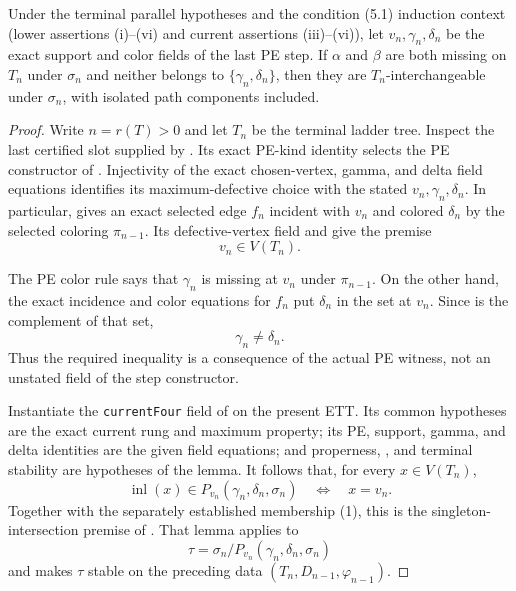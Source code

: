 \begin{helper}
Under the terminal parallel hypotheses and the condition (5.1) induction
context (lower assertions (i)--(vi) and current assertions (iii)--(vi)), let
$v_n,\gamma_n,\delta_n$ be the exact support and color fields of
the last PE step.  If $\alpha$ and $\beta$ are both missing on $T_n$ under
$\sigma_n$ and neither belongs to $\{\gamma_n,\delta_n\}$, then they are
$T_n$-interchangeable under $\sigma_n$, with isolated path components
included.
\end{helper}
\begin{proof}
Write $n=r(T)>0$ and let $T_n$ be the terminal ladder tree.  Inspect the
last certified slot supplied by .  Its exact
PE-kind identity selects the PE constructor of
.  Injectivity of the exact chosen-vertex,
gamma, and delta field equations identifies its maximum-defective choice
with the stated $v_n,\gamma_n,\delta_n$.  In particular,
 gives an exact selected edge $f_n$
incident with $v_n$ and colored $\delta_n$ by the selected coloring
$\pi_{n-1}$.  Its defective-vertex field and
 give the premise
\[
                         v_n\in V(T_n).                         \tag{1}
\]

The PE color rule  says that
$\gamma_n$ is missing at $v_n$ under $\pi_{n-1}$.  On the other hand,
the exact incidence and color equations for $f_n$ put $\delta_n$ in the
set  at $v_n$.  Since
 is the complement of that set,
\[
                         \gamma_n\ne\delta_n.                   \tag{2}
\]
Thus the required inequality is a consequence of the actual PE witness,
not an unstated field of the step constructor.

Instantiate the \texttt{currentFour} field of
 on the present ETT.  Its common
hypotheses are the exact current rung and maximum property; its PE, support,
gamma, and delta identities are the given field equations; and properness,
, and terminal stability are hypotheses of the
lemma.  It follows that, for every $x\in V(T_n)$,
\[
 \operatorname{inl}(x)\in
 P_{v_n}(\gamma_n,\delta_n,\sigma_n)\quad\Longleftrightarrow\quad
 x=v_n.                                                         \tag{3}
\]
Together with the separately established membership (1), this is the
singleton-intersection premise of
.  That lemma applies to
\[
 \tau=\sigma_n/P_{v_n}(\gamma_n,\delta_n,\sigma_n)
\]
and makes $\tau$ stable on the preceding data
$(T_n,D_{n-1},\varphi_{n-1})$.


\end{proof}
